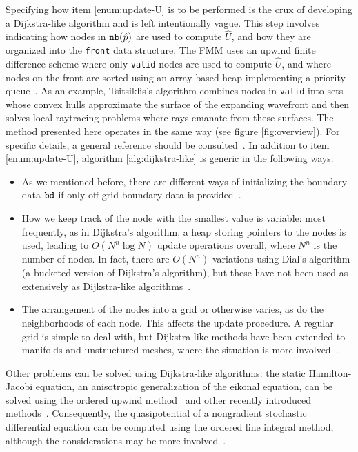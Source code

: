 \documentclass[smallcondensed]{svjour3}
\begin{document}
Specifying how item \ref{enum:update-U} is to be performed is the crux
of developing a Dijkstra-like algorithm and is left intentionally
vague. This step involves indicating how nodes in $\texttt{nb}(\hat{p})$ are
used to compute $\hat{U}$, and how they are organized into the
\texttt{front} data structure. The FMM uses an upwind finite
difference scheme where only \texttt{valid} nodes are used to compute
$\hat{U}$, and where nodes on the front are sorted using an
array-based heap implementing a priority
queue~\cite{sethian1996fast}. As an example, Tsitsiklis's algorithm
combines nodes in \texttt{valid} into sets whose convex hulls
approximate the surface of the expanding wavefront and then solves
local raytracing problems where rays emanate from these surfaces. The
method presented here operates in the same way (see figure
\ref{fig:overview}). For specific details, a general reference should
be consulted~\cite{sethian1999level}. In addition to item
\ref{enum:update-U}, algorithm \ref{alg:dijkstra-like} is generic in
the following ways:
\begin{itemize}
\item As we mentioned before, there are different ways of initializing
  the boundary data $\texttt{bd}$ if only off-grid boundary data is
  provided~\cite{chopp2001some}.
\item How we keep track of the node with the smallest value is
  variable: most frequently, as in Dijkstra's algorithm, a heap
  storing pointers to the nodes is used, leading to $O(N^n \log N)$
  update operations overall, where $N^n$ is the number of nodes. In
  fact, there are $O(N^n)$ variations using Dial's algorithm (a
  bucketed version of Dijkstra's algorithm), but these have not been
  used as extensively as Dijkstra-like
  algorithms~\cite{tsitsiklis1995efficient,kim2001calo,yatziv2006n}.
\item The arrangement of the nodes into a grid or otherwise varies, as
  do the neighborhoods of each node. This affects the update
  procedure. A regular grid is simple to deal with, but Dijkstra-like
  methods have been extended to manifolds and unstructured meshes,
  where the situation is more
  involved~\cite{kimmel1998computing,sethian2000fast,bronstein2008numerical}.
\end{itemize}
Other problems can be solved using Dijkstra-like algorithms: the
static Hamilton-Jacobi equation, an anisotropic generalization of the
eikonal equation, can be solved using the ordered upwind
method~\cite{sethian2003ordered} and other recently introduced
methods~\cite{mirebeau2014efficient,mirebeau2014anisotropic}. Consequently,
the quasipotential of a nongradient stochastic differential equation
can be computed using the ordered line integral method, although the
considerations may be more
involved~\cite{dahiya2017ordered,dahiya2018ordered,yang2019computing}.
\end{document}
